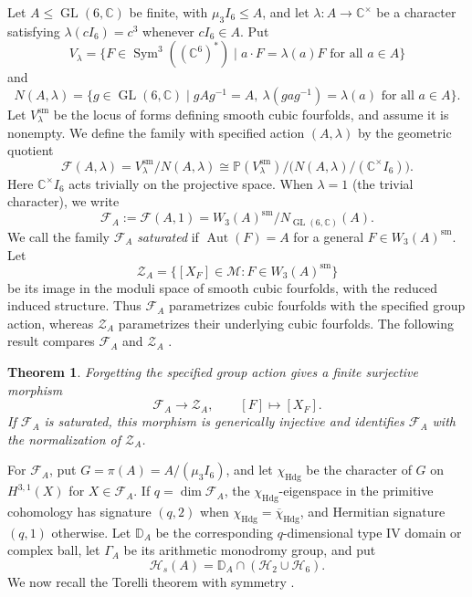 \documentclass[12pt]{amsart}
\numberwithin{equation}{section}
\theoremstyle{plain}
\newtheorem{thm}{Theorem}[section]
\theoremstyle{definition}
\theoremstyle{remark}
\newcommand{\CC}{\mathbb C}
\newcommand{\PP}{\mathbb P}
\newcommand{\DD}{\mathbb D}
\newcommand{\calF}{\mathcal F}
\newcommand{\calH}{\mathcal H}
\newcommand{\calM}{\mathcal M}
\DeclareMathOperator{\Aut}{Aut}
\DeclareMathOperator{\GL}{GL}
\DeclareMathOperator{\Sym}{Sym}
\begin{document}
Let $A\leq\GL(6,\CC)$ be finite, with $\mu_3I_6\leq A$, and let
$\lambda:A\to\CC^\times$ be a character satisfying
$\lambda(cI_6)=c^3$ whenever $cI_6\in A$. Put
\[
V_\lambda=\{F\in\Sym^3((\CC^6)^*)\mid a\cdot F=\lambda(a)F
\text{ for all }a\in A\}
\]
and
\[
N(A,\lambda)=\{g\in\GL(6,\CC)\mid gAg^{-1}=A,
\ \lambda(gag^{-1})=\lambda(a)\text{ for all }a\in A\}.
\]
Let $V_\lambda^{\mathrm{sm}}$ be the locus of forms defining smooth cubic
fourfolds, and assume it is nonempty. We define the family with
specified action $(A,\lambda)$ by the geometric quotient
\begin{equation}\label{eq:YZ-family}
\calF(A,\lambda)
=V_\lambda^{\mathrm{sm}}/N(A,\lambda)
\cong\PP(V_\lambda^{\mathrm{sm}})
\big/\bigl(N(A,\lambda)/(\CC^\times I_6)\bigr).
\end{equation}
Here $\CC^\times I_6$ acts trivially on the projective space.
When $\lambda=1$ (the trivial character), we write
\begin{equation}\label{eq:strict-family-moduli}
\calF_A:=\calF(A,1)
=W_3(A)^{\mathrm{sm}}/N_{\GL(6,\CC)}(A).
\end{equation}
We call the family $\calF_A$ \emph{saturated} if $\Aut(F)=A$
for a general $F\in W_3(A)^{\mathrm{sm}}$.
Let
\[
\mathcal Z_A=\{[X_F]\in\calM:F\in W_3(A)^{\mathrm{sm}}\}
\]
be its image in the moduli space of smooth cubic fourfolds, with the
reduced induced structure. Thus $\calF_A$ parametrizes cubic fourfolds
with the specified group action, whereas $\mathcal Z_A$ parametrizes
their underlying cubic fourfolds. The following result compares $\calF_A$ and $\mathcal Z_A$
\cite[Proposition~2.7]{yu2020moduli}.

\begin{thm}
Forgetting the specified group action gives a finite surjective morphism
\[
\calF_A\longrightarrow\mathcal Z_A,\qquad [F]\longmapsto[X_F].
\]
If $\calF_A$ is saturated, this morphism is generically injective and
identifies $\calF_A$ with the normalization of $\mathcal Z_A$.
\end{thm}

For $\calF_A$, put $G=\pi(A)=A/(\mu_3I_6)$, and let $\chi_{\mathrm{Hdg}}$ be the
character of $G$ on $H^{3,1}(X)$ for $X\in\calF_A$. If
$q=\dim\calF_A$, the $\chi_{\mathrm{Hdg}}$-eigenspace in the
primitive cohomology has signature $(q,2)$ when
$\chi_{\mathrm{Hdg}}=\overline{\chi}_{\mathrm{Hdg}}$, and Hermitian
signature $(q,1)$ otherwise. Let $\DD_A$ be the corresponding
$q$-dimensional type IV domain or complex ball, let
$\Gamma_A$ be its arithmetic monodromy group, and put
\[
\calH_s(A)=\DD_A\cap(\calH_2\cup\calH_6).
\]
We now recall the Torelli theorem with symmetry
\cite[Theorem~1.1]{yu2020moduli}.
\end{document}
